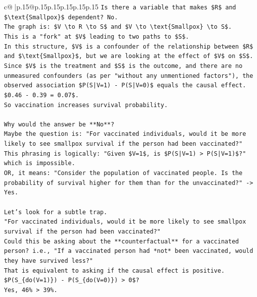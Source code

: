 \documentclass{article}
\begin{document}
{\begin{supertabular}{c@{$\;$}|p{.15\linewidth}@{}p{.15\linewidth}p{.15\linewidth}p{.15\linewidth}p{.15\linewidth}p{.15\linewidth}}
{{{\texttt{Is there a variable that makes \$R\$ and \$\textbackslash{}text\{Smallpox\}\$ dependent? No.} \\
\texttt{The graph is: \$V \textbackslash{}to R \textbackslash{}to S\$ and \$V \textbackslash{}to \textbackslash{}text\{Smallpox\} \textbackslash{}to S\$.} \\
\texttt{This is a "fork" at \$V\$ leading to two paths to \$S\$.} \\
\texttt{In this structure, \$V\$ is a confounder of the relationship between \$R\$ and \$\textbackslash{}text\{Smallpox\}\$, but we are looking at the effect of \$V\$ on \$S\$.} \\
\texttt{Since \$V\$ is the treatment and \$S\$ is the outcome, and there are no unmeasured confounders (as per "without any unmentioned factors"), the observed association \$P(S|V=1) {-} P(S|V=0)\$ equals the causal effect.} \\
\texttt{\$0.46 {-} 0.39 = 0.07\$.} \\
\texttt{So vaccination increases survival probability.} \\
\\ 
\texttt{Why would the answer be **No**?} \\
\texttt{Maybe the question is: "For vaccinated individuals, would it be more likely to see smallpox survival if the person had been vaccinated?"} \\
\texttt{This phrasing is logically: "Given \$V=1\$, is \$P(S|V=1) > P(S|V=1)\$?" which is impossible.} \\
\texttt{OR, it means: "Consider the population of vaccinated people. Is the probability of survival higher for them than for the unvaccinated?" {-}> Yes.} \\
\\ 
\texttt{Let's look for a subtle trap.} \\
\texttt{"For vaccinated individuals, would it be more likely to see smallpox survival if the person had been vaccinated?"} \\
\texttt{Could this be asking about the **counterfactual** for a vaccinated person? i.e., "If a vaccinated person had *not* been vaccinated, would they have survived less?"} \\
\texttt{That is equivalent to asking if the causal effect is positive.} \\
\texttt{\$P(S\_\{do(V=1)\}) {-} P(S\_\{do(V=0)\}) > 0\$?} \\
\texttt{Yes, 46\% > 39\%.} \\
\\ 
}}}
\end{supertabular}}
\end{document}
